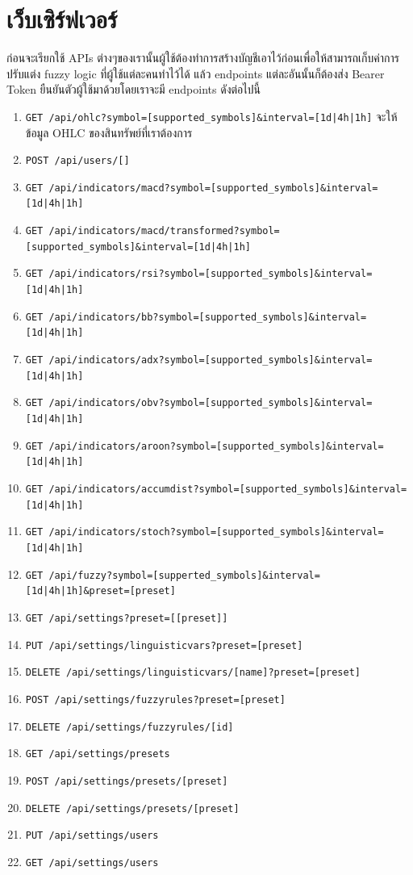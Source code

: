 \section{เว็บเซิร์ฟเวอร์}
ก่อนจะเรียกใช้ APIs ต่างๆของเรานั้นผู้ใช้ต้องทำการสร้างบัญชีเอาไว้ก่อนเพื่อให้สามารถเก็บค่าการปรับแต่ง fuzzy logic ที่ผู้ใช้แต่ละคนทำไว้ได้ แล้ว endpoints 
แต่ละอันนั้นก็ต้องส่ง Bearer Token ยืนยันตัวผู้ใช้มาด้วยโดยเราจะมี endpoints ดังต่อไปนี้
\begin{enumerate}
    \item \texttt{GET /api/ohlc?symbol=[supported\_symbols]\&interval=[1d|4h|1h]} จะให้ข้อมูล OHLC ของสินทรัพย์ที่เราต้องการ
    \item \texttt{POST /api/users/[]}
    
    \item \texttt{GET /api/indicators/macd?symbol=[supported\_symbols]\&interval=[1d|4h|1h]}
    \item \texttt{GET /api/indicators/macd/transformed?symbol=[supported\_symbols]\&interval=[1d|4h|1h]} 
    \item \texttt{GET /api/indicators/rsi?symbol=[supported\_symbols]\&interval=[1d|4h|1h]} 
    \item \texttt{GET /api/indicators/bb?symbol=[supported\_symbols]\&interval=[1d|4h|1h]} 
    \item \texttt{GET /api/indicators/adx?symbol=[supported\_symbols]\&interval=[1d|4h|1h]} 
    \item \texttt{GET /api/indicators/obv?symbol=[supported\_symbols]\&interval=[1d|4h|1h]} 
    \item \texttt{GET /api/indicators/aroon?symbol=[supported\_symbols]\&interval=[1d|4h|1h]}
    \item \texttt{GET /api/indicators/accumdist?symbol=[supported\_symbols]\&interval=[1d|4h|1h]}  
    \item \texttt{GET /api/indicators/stoch?symbol=[supported\_symbols]\&interval=[1d|4h|1h]} 

    \item \texttt{GET /api/fuzzy?symbol=[supperted\_symbols]\&interval=[1d|4h|1h]\&preset=[preset]} 
    
    \item \texttt{GET /api/settings?preset=[[preset]]}
    \item \texttt{PUT /api/settings/linguisticvars?preset=[preset]}
    \item \texttt{DELETE /api/settings/linguisticvars/[name]?preset=[preset]}
    \item \texttt{POST /api/settings/fuzzyrules?preset=[preset]}
    \item \texttt{DELETE /api/settings/fuzzyrules/[id]}
    \item \texttt{GET /api/settings/presets}
    \item \texttt{POST /api/settings/presets/[preset]}
    \item \texttt{DELETE /api/settings/presets/[preset]}
    \item \texttt{PUT /api/settings/users}
    \item \texttt{GET /api/settings/users}
    

\end{enumerate}
